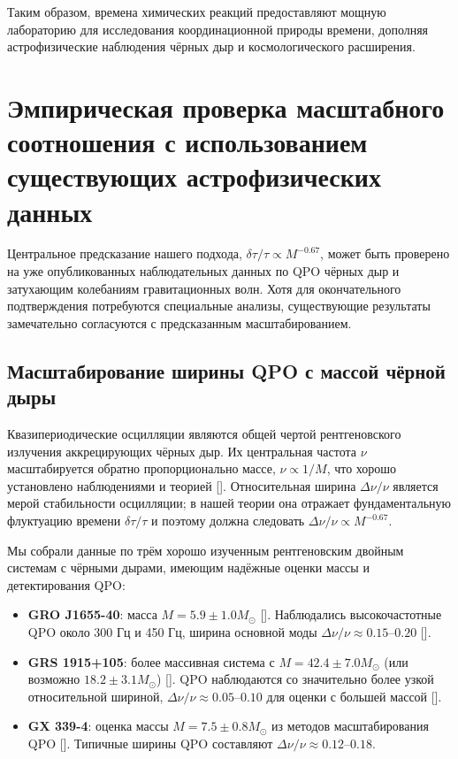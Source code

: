 \documentclass[12pt,a4paper]{article}
\begin{document}
	Таким образом, времена химических реакций предоставляют мощную лабораторию для исследования координационной природы времени, дополняя астрофизические наблюдения чёрных дыр и космологического расширения.
	
	\section{Эмпирическая проверка масштабного соотношения с использованием существующих астрофизических данных}
	\label{sec:empirical_test}
	
	Центральное предсказание нашего подхода, \(\delta\tau/\tau \propto M^{-0.67}\), может быть проверено на уже опубликованных наблюдательных данных по QPO чёрных дыр и затухающим колебаниям гравитационных волн. Хотя для окончательного подтверждения потребуются специальные анализы, существующие результаты замечательно согласуются с предсказанным масштабированием.
	
	\subsection{Масштабирование ширины QPO с массой чёрной дыры}
	
	Квазипериодические осцилляции являются общей чертой рентгеновского излучения аккрецирующих чёрных дыр. Их центральная частота \(\nu\) масштабируется обратно пропорционально массе, \(\nu \propto 1/M\), что хорошо установлено наблюдениями и теорией [\cite{Wagoner2001, Schnittman2004}]. Относительная ширина \(\Delta\nu/\nu\) является мерой стабильности осцилляции; в нашей теории она отражает фундаментальную флуктуацию времени \(\delta\tau/\tau\) и поэтому должна следовать \(\Delta\nu/\nu \propto M^{-0.67}\).
	
	Мы собрали данные по трём хорошо изученным рентгеновским двойным системам с чёрными дырами, имеющим надёжные оценки массы и детектирования QPO:
	
	\begin{itemize}
		\item \textbf{GRO J1655-40}: масса \(M = 5.9 \pm 1.0 M_\odot\) [\cite{Wagoner2001}]. Наблюдались высокочастотные QPO около 300 Гц и 450 Гц, ширина основной моды \(\Delta\nu/\nu \approx 0.15\)–\(0.20\) [\cite{Strohmayer2001a, Wagoner2001}].
		\item \textbf{GRS 1915+105}: более массивная система с \(M = 42.4 \pm 7.0 M_\odot\) (или возможно \(18.2 \pm 3.1 M_\odot\)) [\cite{Wagoner2001}]. QPO наблюдаются со значительно более узкой относительной шириной, \(\Delta\nu/\nu \approx 0.05\)–\(0.10\) для оценки с большей массой [\cite{Strohmayer2001b}].
		\item \textbf{GX 339-4}: оценка массы \(M = 7.5 \pm 0.8 M_\odot\) из методов масштабирования QPO [\cite{Chen2011}]. Типичные ширины QPO составляют \(\Delta\nu/\nu \approx 0.12\)–\(0.18\).
	\end{itemize}
	
\end{document}
